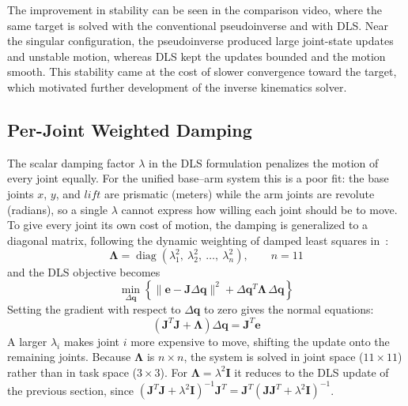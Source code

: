 \documentclass[12pt,a4paper]{article}
\begin{document}
The improvement in stability can be seen in the comparison
video, where the same target is solved with
the conventional pseudoinverse and with DLS. Near the singular
configuration, the pseudoinverse produced large joint-state updates and unstable motion, whereas DLS kept the updates bounded and the motion smooth. This stability came at the cost of slower convergence toward the target, which motivated further development of the inverse kinematics
solver.
\newpage

\subsection*{Per-Joint Weighted Damping}
The scalar damping factor $\lambda$ in the DLS formulation penalizes the motion of every joint equally. For the unified base--arm system this is a poor fit: the base joints $x$, $y$, and $lift$ are prismatic (meters) while the arm joints are revolute (radians), so a single $\lambda$ cannot express how willing each joint should be to move. To give every joint its own cost of motion, the damping is generalized to a diagonal matrix, following the dynamic weighting of damped least squares in~\cite{schinstock1994}:
\begin{equation}
    \boldsymbol{\Lambda} = \operatorname{diag}\!\left(\lambda_1^2,\ \lambda_2^2,\ \dots,\ \lambda_n^2\right),
    \qquad n = 11
\end{equation}
and the DLS objective becomes
\begin{equation}
    \min_{\Delta\mathbf{q}}
    \left\{
        \|\mathbf{e}-\mathbf{J}\Delta\mathbf{q}\|^2
        + \Delta\mathbf{q}^{T}\boldsymbol{\Lambda}\,\Delta\mathbf{q}
    \right\}
\end{equation}
Setting the gradient with respect to $\Delta\mathbf{q}$ to zero gives the normal equations:
\begin{equation}
    \left(\mathbf{J}^{T}\mathbf{J} + \boldsymbol{\Lambda}\right)\Delta\mathbf{q}
    = \mathbf{J}^{T}\mathbf{e}
    \label{eq:weighted_dls}
\end{equation}
A larger $\lambda_i$ makes joint $i$ more expensive to move, shifting the update onto the remaining joints. Because $\boldsymbol{\Lambda}$ is $n\times n$, the system is solved in joint space ($11\times 11$) rather than in task space ($3\times 3$). For $\boldsymbol{\Lambda}=\lambda^2\mathbf{I}$ it reduces to the DLS update of the previous section, since $(\mathbf{J}^{T}\mathbf{J}+\lambda^2\mathbf{I})^{-1}\mathbf{J}^{T} = \mathbf{J}^{T}(\mathbf{J}\mathbf{J}^{T}+\lambda^2\mathbf{I})^{-1}$.
\end{document}
